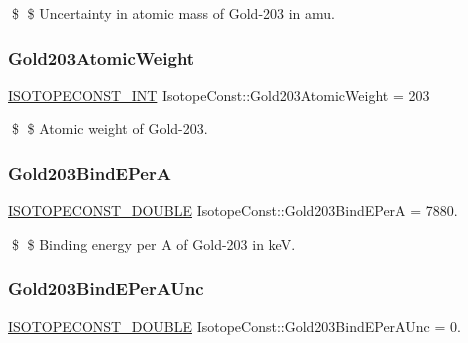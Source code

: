 \$ \$ Uncertainty in atomic mass of Gold-\/203 in amu. \mbox{\label{group___isotope_const-_gold-_au203_ga14699f8d2d66a7a2ccc5a93b51fa3e9e}} 
\subsubsection{\texorpdfstring{Gold203\+Atomic\+Weight}{Gold203AtomicWeight}}
{\footnotesize\ttfamily \mbox{\hyperlink{group___isotope_const-_macros_ga5f18360b3e99483a35c32d789e62621c}{I\+S\+O\+T\+O\+P\+E\+C\+O\+N\+S\+T\+\_\+\+I\+NT}} Isotope\+Const\+::\+Gold203\+Atomic\+Weight = 203}

\$ \$ Atomic weight of Gold-\/203. \mbox{\label{group___isotope_const-_gold-_au203_ga80d14842962699acbcb74b7ef59b8727}} 
\subsubsection{\texorpdfstring{Gold203\+Bind\+E\+PerA}{Gold203BindEPerA}}
{\footnotesize\ttfamily \mbox{\hyperlink{group___isotope_const-_macros_ga8f45a7272ce02c0b4c65c44636ed719a}{I\+S\+O\+T\+O\+P\+E\+C\+O\+N\+S\+T\+\_\+\+D\+O\+U\+B\+LE}} Isotope\+Const\+::\+Gold203\+Bind\+E\+PerA = 7880.}

\$ \$ Binding energy per A of Gold-\/203 in keV. \mbox{\label{group___isotope_const-_gold-_au203_ga738d63a3d5f7a4291f82bd8ac1a7060b}} 
\subsubsection{\texorpdfstring{Gold203\+Bind\+E\+Per\+A\+Unc}{Gold203BindEPerAUnc}}
{\footnotesize\ttfamily \mbox{\hyperlink{group___isotope_const-_macros_ga8f45a7272ce02c0b4c65c44636ed719a}{I\+S\+O\+T\+O\+P\+E\+C\+O\+N\+S\+T\+\_\+\+D\+O\+U\+B\+LE}} Isotope\+Const\+::\+Gold203\+Bind\+E\+Per\+A\+Unc = 0.}

